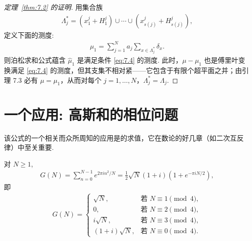 \begin{proof}[定理~\ref{thm:7.2} 的证明]
用集合族
\begin{align*}
  \Lambda_{j}^{*}=(x_{1}^{j}+H_{1}^{j})\cup\cdots\cup(x_{s(j)}^{j}+H_{s(j)}^{j}),
\end{align*}
定义下面的测度:
\begin{align*}
  \mu_{1}=\sum_{j=1}^{N}a_{j}\sum_{x\in\Lambda_{j}^{*}}\delta_{x}.
\end{align*}
则泊松求和公式蕴含 $\widehat{\mu}_1$ 是满足条件 \eqref{eq:7.4} 的测度. 此时，$\mu - \mu_1$ 也是傅里叶变换满足 \eqref{eq:7.4} 的测度，但其支集不相对紧——它包含于有限个超平面之并；由引理 7.3 必有 $\mu = \mu_1$，从而对每个 $j = 1, \ldots, N$，$\Lambda_j^* = \Lambda_j$.
\end{proof}

\section{一个应用: 高斯和的相位问题}

该公式的一个相关而众所周知的应用是的求值，它在数论的好几章（如二次互反律）中至关重要.

\begin{theorem}\label{thm:7.6}
对 $N \geq 1$,
\begin{align*}
  G(N)=\sum_{n=0}^{N-1}e^{2\pi i n^{2}/N}
  =\frac{1}{2}\sqrt{N}\left(1+i\right)\left(1+e^{-\pi i N/2}\right),
\end{align*}
即
\begin{align*}
  G(N)=\begin{cases}
    \sqrt{N}, & \text{若 } N\equiv 1\pmod{4},\\
    0, & \text{若 } N\equiv 2\pmod{4},\\
    i\sqrt{N}, & \text{若 } N\equiv 3\pmod{4},\\
    (1+i)\sqrt{N}, & \text{若 } N\equiv 0\pmod{4}.
  \end{cases}
\end{align*}
\end{theorem}

